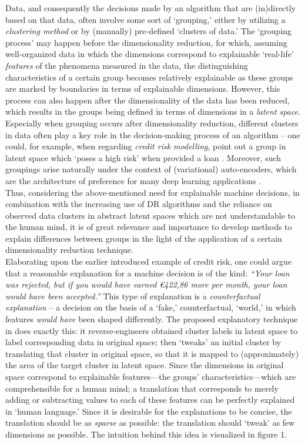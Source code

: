 Data, and consequently the decisions made by an algorithm that are (in)directly based on that data, often involve some sort of `grouping,' either by utilizing a \textit{clustering method} or by (manually) pre-defined `clusters of data.' The `grouping process' may happen before the dimensionality reduction, for which, assuming well-organized data in which the dimensions correspond to explainable `real-life' \textit{features} of the phenomena measured in the data, the distinguishing characteristics of a certain group becomes relatively explainable as these groups are marked by boundaries in terms of explainable dimensions. However, this process can also happen after the dimensionality of the data has been reduced, which results in the groups being defined in terms of dimensions in a \textit{latent space}. Especially when grouping occurs after dimensionality reduction, different clusters in data often play a key role in the decision-making process of an algorithm -- one could, for example, when regarding \textit{credit risk modelling}, point out a group in latent space which `poses a high risk' when provided a loan \cite{MANCISIDOR2021114020}. Moreover, such groupings arise naturally under the context of (variational) auto-encoders, which are the architecture of preference for many deep learning applications \cite[p.~8]{plumb2020explaining}.\\

Thus, considering the above-mentioned need for explainable machine decisions, in combination with the increasing use of DR algorithms and the reliance on observed data clusters in abstract latent spaces which are not understandable to the human mind, it is of great relevance and importance to develop methods to explain differences between groups in the light of the application of a certain dimensionality reduction technique.\\

Elaborating upon the earlier introduced example of credit risk, one could argue that a reasonable explanation for a machine decision is of the kind: \textit{``Your loan was rejected, but if you would have earned \euro422,86 more per month, your loan would have been accepted.''} This type of explanation is a \textit{counterfactual explanation} -- a decision on the basis of a `fake,' counterfactual, `world,' in which features \textit{would have} been shaped differently. The proposed explanatory technique in \cite{plumb2020explaining} does exactly this: it reverse-engineers obtained cluster labels in latent space to label corresponding data in original space; then `tweaks' an initial cluster by translating that cluster in original space, so that it is mapped to (approximately) the area of the target cluster in latent space. Since the dimensions in original space correspond to explainable features---the groups' characteristics---which are comprehensible for a human mind; a translation that corresponds to merely adding or subtracting values to each of these features can be perfectly explained in `human language.' Since it is desirable for the explanations to be concise, the translation should be as \textit{sparse} as possible: the translation should `tweak' as few dimensions as possible. The intuition behind this idea is visualized in figure 1.

